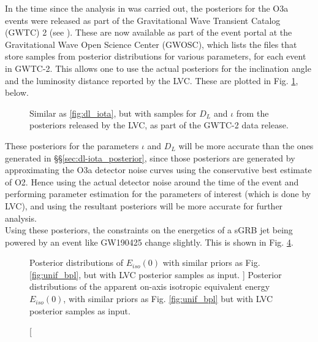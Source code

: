     In the time since the analysis in \cite{saleem_2020B} was carried out, the
    posteriors for the O3a events were released as part of the Gravitational Wave
    Transient Catalog (GWTC) 2 (see \cite{abbott_2020A}). These are now available as
    part of the event portal at the Gravitational Wave Open Science Center (GWOSC),
    which lists the files that store samples from posterior distributions for various
    parameters, for each event in GWTC-2. This allows one to use the actual posteriors
    for the inclination angle and the luminosity distance reported by the LVC. These are
    plotted in Fig. \ref{fig:dl-iota_post_updated}, below.\\

    \begin{figure}[H]
        \centering
        \def\svgwidth{\textwidth}
        
        \caption[$D_L-\iota$ posterior, with samples from the data released by LVC.]
        {
            Similar as \ref{fig:dl_iota}, but with samples for $D_L$ and $\iota$ from
            the posteriors released by the LVC, as part of the GWTC-2 data release.
        }
        \label{fig:dl-iota_post_updated}
    \end{figure}

    These posteriors for the parameters $\iota$ and $D_L$ will be more accurate than the
    ones generated in \S\S\ref{sec:dl-iota_posterior}, since those posteriors are
    generated by approximating the O3a detector noise curves using the conservative best
    estimate of O2. Hence using the actual detector noise around the time of the event
    and performing parameter estimation for the parameters of interest (which is done by
    LVC), and using the resultant posteriors will be more accurate for further
    analysis.\\
    Using these posteriors, the constraints on the energetics of a sGRB jet
    being powered by an event like GW190425 change slightly. This is shown in Fig.
    \ref{fig:unif_bpl_updated}.

    \begin{figure}[H]
        \begin{subfigure}{0.5\textwidth}
              \label{fig:unif_updated}
              \centering
              \def\svgwidth{\textwidth}
              
        \end{subfigure}%
        \begin{subfigure}{0.5\textwidth}
              \label{fig:bpl_updated}
              \centering
              \def\svgwidth{\textwidth}
              
        \end{subfigure}
        \caption
        [
            Posterior distributions of $E_{iso}(0)$ with similar priors as Fig.
            \ref{fig:unif_bpl}, but with LVC posterior samples as input.
        ]
        {
            Posterior distributions of the apparent on-axis isotropic equivalent energy
            $E_{iso}(0)$, with similar priors as Fig. \ref{fig:unif_bpl} but with LVC
            posterior samples as input.
        }
        \label{fig:unif_bpl_updated}
    \end{figure}

